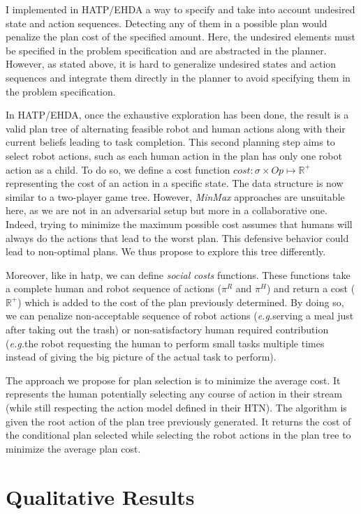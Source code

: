 I implemented in HATP/EHDA a way to specify and take into account undesired state and action sequences. Detecting any of them in a possible plan would penalize the plan cost of the specified amount. Here, the undesired elements must be specified in the problem specification and are abstracted in the planner. However, as stated above, it is hard to generalize undesired states and action sequences and integrate them directly in the planner to avoid specifying them in the problem specification.

In HATP/EHDA, once the exhaustive exploration has been done, the result is a valid plan tree of alternating feasible robot and human actions along with their current beliefs leading to task completion. This second planning step aims to select robot actions, such as each human action in the plan has only one robot action as a child.
To do so, we define a cost function $cost: \sigma \times Op \mapsto \mathbb{R}^+$ representing the cost of an action in a specific state. The data structure is now similar to a two-player game tree. However, \textit{MinMax} approaches are unsuitable here, as we are not in an adversarial setup but more in a collaborative one. Indeed, trying to minimize the maximum possible cost assumes that humans will always do the actions that lead to the worst plan. This defensive behavior could lead to non-optimal plans. We thus propose to explore this tree differently.

Moreover, like in \acrshort{hatp}, we can define \textit{social costs} functions. These functions take a complete human and robot sequence of actions ($\pi^R$ and $\pi^H$) and return a cost ($\mathbb{R}^+$) which is added to the cost of the plan previously determined. By doing so, we can penalize non-acceptable sequence of robot actions (\textit{e.g.}serving a meal just after taking out the trash) or non-satisfactory human required contribution (\textit{e.g.}the robot requesting the human to perform small tasks multiple times instead of giving the big picture of the actual task to perform).

The approach we propose for plan selection is to minimize the average cost. It represents the human potentially selecting any course of action in their stream (while still respecting the action model defined in their HTN).
The algorithm is given the root action of the plan tree previously generated. It returns the cost of the conditional plan selected while selecting the robot actions in the plan tree to minimize the average plan cost.

\section{Qualitative Results}


